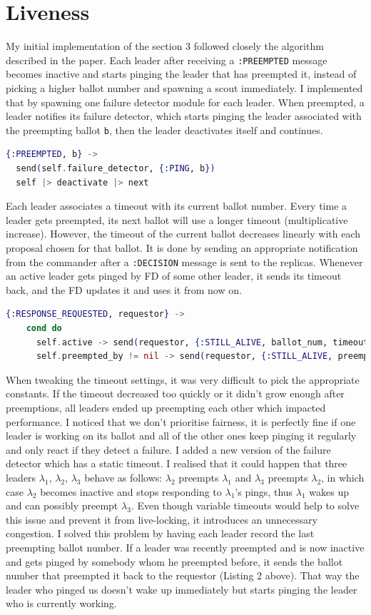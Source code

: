 \documentclass[11pt]{article}
\begin{document}
\pagebreak
\section*{Liveness}
My initial implementation of the section 3 followed closely the algorithm
described in the paper. Each leader after receiving a \texttt{:PREEMPTED}
message becomes inactive and starts pinging the leader that has preempted it,
instead of picking a higher ballot number and spawning a scout immediately. I
implemented that by spawning one failure detector module for each leader. When
preempted, a leader notifies its failure detector, which starts pinging the
leader associated with the preempting ballot \texttt{b}, then the leader
deactivates itself and continues.
\begin{lstlisting}[language=elixir, caption={New way of handling \texttt{:PREEMPTED} messages.},captionpos=b]
{:PREEMPTED, b} ->
  send(self.failure_detector, {:PING, b})
  self |> deactivate |> next
\end{lstlisting}
Each leader associates a timeout with its current ballot number. Every time a
leader gets preempted, its next ballot will use a longer timeout (multiplicative
increase). However, the timeout of the current ballot decreases linearly with each
proposal chosen for that ballot. It is done by sending an appropriate notification
from the commander after a \texttt{:DECISION} message is sent to the replicas.
Whenever an active leader gets pinged by FD of some other leader, it sends
its timeout back, and the FD updates it and uses it from now on.
\begin{lstlisting}[language=elixir, caption={Leader responding to a ping message.},captionpos=b]
{:RESPONSE_REQUESTED, requestor} ->
    cond do
      self.active -> send(requestor, {:STILL_ALIVE, ballot_num, timeout})
      self.preempted_by != nil -> send(requestor, {:STILL_ALIVE, preempted_by, timeout})
\end{lstlisting}
When tweaking the timeout settings, it was very difficult to pick the
appropriate constants. If the timeout decreased too quickly or it didn't grow
enough after preemptions, all leaders ended up preempting each other which
impacted performance. I noticed that we don't prioritise fairness, it is
perfectly fine if one leader is working on its ballot and all of the other ones
keep pinging it regularly and only react if they detect a failure. I added a
new version of the failure detector which has a static timeout. I realised that
it could happen that three leaders $\lambda_1$, $\lambda_2$,  $\lambda_3$
behave as follows: $\lambda_2$ preempts $\lambda_1$ and $\lambda_3$ preempts
$\lambda_2$, in which case $\lambda_2$ becomes inactive and stops responding to
$\lambda_1$'s pings, thus $\lambda_1$ wakes up and can possibly preempt
$\lambda_3$. Even though variable timeouts would help to solve this issue and
prevent it from live-locking, it introduces an unnecessary congestion. I solved
this problem by having each leader record the last preempting ballot number. If
a leader was recently preempted and is now inactive and gets pinged by somebody
whom he preempted before, it sends the ballot number that preempted it back to
the requestor (Listing 2 above). That way the leader who pinged us doesn't wake up immediately
but starts pinging the leader who is currently working.
\pagebreak
\end{document}
